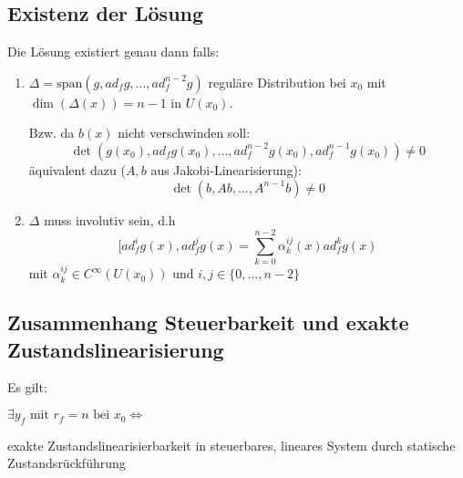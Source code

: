 \subsection{Existenz der Lösung}
Die Lösung existiert genau dann falls:
\begin{enumerate}
    \item 
        $\Delta = \text{span}(g, ad_f g, \ldots, ad_f^{n-2} g)$ reguläre Distribution
        bei $x_0$ mit $\dim(\Delta(x)) = n-1$ in $U(x_0)$.

        Bzw. da $b(x)$ nicht verschwinden soll:
        \begin{equation}
            \det(g(x_0), ad_f g(x_0), \ldots, ad_f^{n-2} g(x_0), ad_f^{n-1} g(x_0)) \neq 0
        \end{equation}
        äquivalent dazu ($A, b$ aus Jakobi-Linearisierung):
        \begin{equation}
            \det(b, Ab, \ldots, A^{n-1} b) \neq 0
        \end{equation}
    \item
        $\Delta$ muss involutiv sein, d.h 
        \begin{equation}
            [ad_f^i g(x), ad_f^j g(x)
                = \sum_{k=0}^{n-2} \alpha_k^{ij} (x) ad_f^k g(x)
        \end{equation}
        mit $\alpha_k^{ij} \in C^\infty (U(x_0))$ und $i, j \in \{0, \ldots, n-2\}$
\end{enumerate}

\subsection{Zusammenhang Steuerbarkeit und exakte Zustandslinearisierung}
Es gilt: 

$\exists y_f \text{ mit } r_f = n \text{ bei } x_0 \Leftrightarrow$

exakte Zustandslinearisierbarkeit in steuerbares, lineares System durch statische 
Zustandsrückführung

